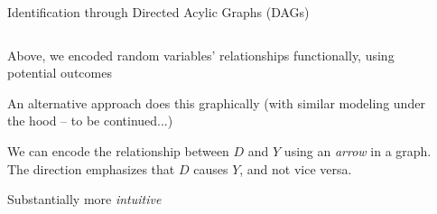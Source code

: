 \documentclass[notes,11pt, aspectratio=169]{beamer}
\newenvironment{wideitemize}{\itemize\addtolength{\itemsep}{10pt}}{\enditemize}
\begin{document}
\begin{frame}{Identification through Directed Acylic Graphs (DAGs)}
\begin{columns}[T] %
  \begin{column}{.5\textwidth}
    \begin{wideitemize}
    \item Above, we encoded random variables' relationships
      functionally, using potential outcomes
    \item An alternative approach does this graphically (with similar
      modeling under the hood -- to be continued...)
    \item We can encode the relationship between $D$ and $Y$ using an
      \emph{arrow} in a graph. The direction emphasizes that $D$
      causes $Y$, and not vice versa.
    \item Substantially more \emph{intuitive}
    \end{wideitemize}
  \end{column}%
  \hfill%
  \begin{column}{.5\textwidth}
    \begin{center}
    \end{center}
  \end{column}
\end{columns}
\end{frame}
\end{document}
